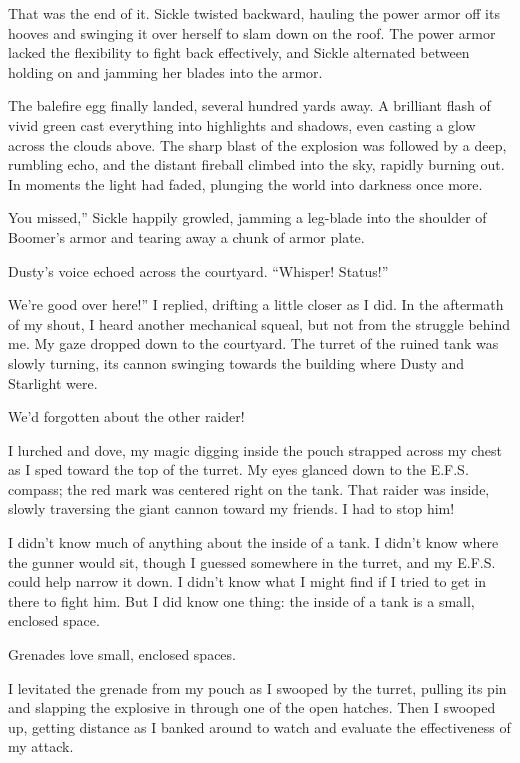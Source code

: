 That was the end of it. Sickle twisted backward, hauling the power armor off its hooves and swinging it over herself to slam down on the roof. The power armor lacked the flexibility to fight back effectively, and Sickle alternated between holding on and jamming her blades into the armor.

The balefire egg finally landed, several hundred yards away. A brilliant flash of vivid green cast everything into highlights and shadows, even casting a glow across the clouds above. The sharp blast of the explosion was followed by a deep, rumbling echo, and the distant fireball climbed into the sky, rapidly burning out. In moments the light had faded, plunging the world into darkness once more.

\leavevmode{}You missed,” Sickle happily growled, jamming a leg-blade into the shoulder of Boomer’s armor and tearing away a chunk of armor plate.

Dusty’s voice echoed across the courtyard. “Whisper! Status!”

\leavevmode{}We’re good over here!” I replied, drifting a little closer as I did. In the aftermath of my shout, I heard another mechanical squeal, but not from the struggle behind me. My gaze dropped down to the courtyard. The turret of the ruined tank was slowly turning, its cannon swinging towards the building where Dusty and Starlight were.

We’d forgotten about the other raider!

I lurched and dove, my magic digging inside the pouch strapped across my chest as I sped toward the top of the turret. My eyes glanced down to the E.F.S. compass; the red mark was centered right on the tank. That raider was inside, slowly traversing the giant cannon toward my friends. I had to stop him!

I didn’t know much of anything about the inside of a tank. I didn’t know where the gunner would sit, though I guessed somewhere in the turret, and my E.F.S. could help narrow it down. I didn’t know what I might find if I tried to get in there to fight him. But I did know one thing: the inside of a tank is a small, enclosed space.

Grenades love small, enclosed spaces.

I levitated the grenade from my pouch as I swooped by the turret, pulling its pin and slapping the explosive in through one of the open hatches. Then I swooped up, getting distance as I banked around to watch and evaluate the effectiveness of my attack.

